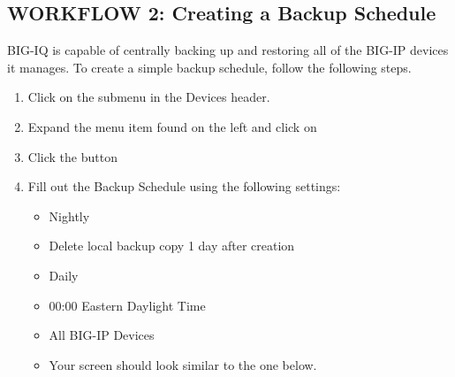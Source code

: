 \documentclass[letterpaper,10pt,english]{sphinxmanual}
\begin{document}
\subsection{WORKFLOW 2: Creating a Backup Schedule}
\label{\detokenize{class1/module4/lab4:workflow-2-creating-a-backup-schedule}}
BIG-IQ is capable of centrally backing up and restoring all of the
BIG-IP devices it manages. To create a simple backup schedule, follow
the following steps.
\begin{enumerate}
\item {} 
Click on the  submenu in the Devices header.
\begin{quote}

\end{quote}

\item {} 
Expand the  menu item found on the left and
click on 

\item {} 
Click the  button
\begin{quote}

\end{quote}

\item {} 
Fill out the Backup Schedule using the following settings:
\begin{itemize}
\item {} 
 Nightly

\item {} 
 Delete local backup copy 1 day after creation

\item {} 
 Daily

\item {} 
 00:00 Eastern Daylight Time

\item {} 
 All BIG-IP Devices

\item {} 
Your screen should look similar to the one below.



\end{itemize}
\end{enumerate}
\end{document}

